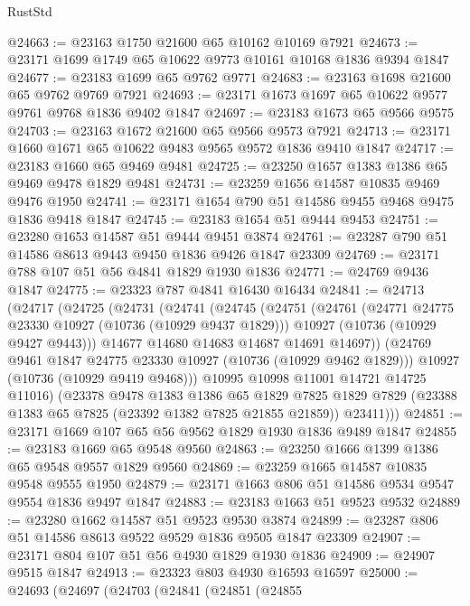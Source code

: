 \begin{lexlean}{RustStd}
\begin{coremodule}
@24663 := @23163 @1750 @21600 @65 @10162 @10169 @7921
@24673 := @23171 @1699 @1749 @65 @10622 @9773 @10161 @10168 @1836 @9394 @1847
@24677 := @23183 @1699 @65 @9762 @9771
@24683 := @23163 @1698 @21600 @65 @9762 @9769 @7921
@24693 := @23171 @1673 @1697 @65 @10622 @9577 @9761 @9768 @1836 @9402 @1847
@24697 := @23183 @1673 @65 @9566 @9575
@24703 := @23163 @1672 @21600 @65 @9566 @9573 @7921
@24713 := @23171 @1660 @1671 @65 @10622 @9483 @9565 @9572 @1836 @9410 @1847
@24717 := @23183 @1660 @65 @9469 @9481
@24725 := @23250 @1657 @1383 @1386 @65 @9469 @9478 @1829 @9481
@24731 := @23259 @1656 @14587 @10835 @9469 @9476 @1950
@24741 := @23171 @1654 @790 @51 @14586 @9455 @9468 @9475 @1836 @9418 @1847
@24745 := @23183 @1654 @51 @9444 @9453
@24751 := @23280 @1653 @14587 @51 @9444 @9451 @3874
@24761 := @23287 @790 @51 @14586 @8613 @9443 @9450 @1836 @9426 @1847 @23309
@24769 := @23171 @788 @107 @51 @56 @4841 @1829 @1930 @1836
@24771 := @24769 @9436 @1847
@24775 := @23323 @787 @4841 @16430 @16434
@24841 := @24713
    (@24717
      (@24725
        (@24731
          (@24741
            (@24745
              (@24751
                (@24761
                  (@24771 @24775 @23330 @10927 (@10736 (@10929 @9437 @1829)))
                  @10927
                  (@10736 (@10929 @9427 @9443)))
                @14677
                @14680
                @14683
                @14687
                @14691
                @14697))
            (@24769 @9461 @1847 @24775 @23330 @10927 (@10736 (@10929 @9462 @1829)))
            @10927
            (@10736 (@10929 @9419 @9468)))
          @10995
          @10998
          @11001
          @14721
          @14725
          @11016)
        (@23378
          @9478
          @1383
          @1386
          @65
          @1829
          @7825
          @1829
          @7829
          (@23388 @1383 @65 @7825 (@23392 @1382 @7825 @21855 @21859))
          @23411)))
@24851 := @23171 @1669 @107 @65 @56 @9562 @1829 @1930 @1836 @9489 @1847
@24855 := @23183 @1669 @65 @9548 @9560
@24863 := @23250 @1666 @1399 @1386 @65 @9548 @9557 @1829 @9560
@24869 := @23259 @1665 @14587 @10835 @9548 @9555 @1950
@24879 := @23171 @1663 @806 @51 @14586 @9534 @9547 @9554 @1836 @9497 @1847
@24883 := @23183 @1663 @51 @9523 @9532
@24889 := @23280 @1662 @14587 @51 @9523 @9530 @3874
@24899 := @23287 @806 @51 @14586 @8613 @9522 @9529 @1836 @9505 @1847 @23309
@24907 := @23171 @804 @107 @51 @56 @4930 @1829 @1930 @1836
@24909 := @24907 @9515 @1847
@24913 := @23323 @803 @4930 @16593 @16597
@25000 := @24693
    (@24697
      (@24703
        (@24841
          (@24851
            (@24855

\end{coremodule}
\end{lexlean}

